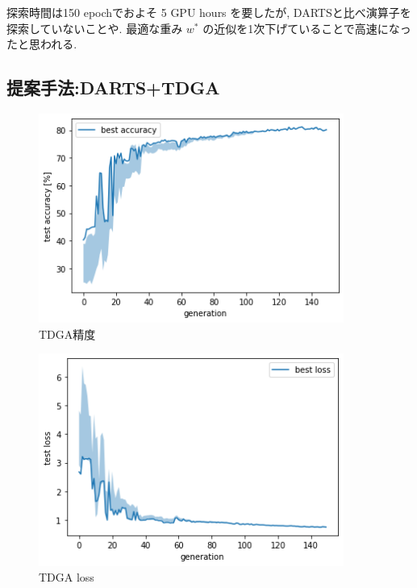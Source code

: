 探索時間は150 epochでおよそ 5 GPU hours を要したが, DARTSと比べ演算子を探索していないことや.
最適な重み $w^*$ の近似を1次下げていることで高速になったと思われる.




\clearpage
\changeindent{0cm}
\subsection{提案手法:DARTS+TDGA}
\label{sec:exp.02}
\changeindent{2cm}


\begin{figure}[t]
  \begin{center}
    \includegraphics[clip,width=10cm]{./fig/04.exp/acc_tdga.png}
  \end{center}
  \caption{TDGA精度}
  \label{fig:acc_tdga}
\end{figure}

\begin{figure}[t]
  \begin{center}
    \includegraphics[clip,width=10cm]{./fig/04.exp/loss_tdga.png}
  \end{center}
  \caption{TDGA loss}
  \label{fig:loss_tdga}
\end{figure}

